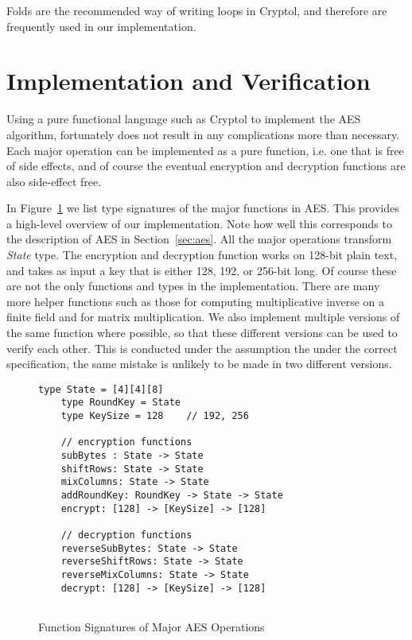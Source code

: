 \documentclass[a4paper, notitlepage]{report}
\begin{document}
Folds are the recommended way of writing loops in Cryptol, and therefore are
frequently used in our implementation.


\section{Implementation and Verification}
\label{sec:correct}

Using a pure functional language such as Cryptol to implement the AES algorithm,
fortunately does not result in any complications more than necessary. Each major
operation can be implemented as a pure function, i.e. one that is free of side
effects, and of course the eventual encryption and decryption functions are also
side-effect free.

In Figure~\ref{fig:functions} we list type signatures of the major functions
in AES. This provides a high-level overview of our implementation. Note how
well this corresponds to the description of AES in Section~\ref{sec:aes}.
All the major operations transform \emph{State} type. The encryption and decryption
function works on 128-bit plain text, and takes as input a key that is either
128, 192, or 256-bit long. Of course these are not the only functions and types in
the implementation. There are many more helper functions such as those for computing
multiplicative inverse on a finite field and for matrix multiplication.
We also implement multiple versions of the same function where possible, so that
these different versions can be used to verify each other. This is conducted
under the assumption the under the correct specification, the same mistake is
unlikely to be made in two different versions.

\begin{figure}
  \begin{lstlisting}[frame=single]
    type State = [4][4][8]
    type RoundKey = State
    type KeySize = 128    // 192, 256

    // encryption functions
    subBytes : State -> State
    shiftRows: State -> State
    mixColumns: State -> State
    addRoundKey: RoundKey -> State -> State
    encrypt: [128] -> [KeySize] -> [128]

    // decryption functions
    reverseSubBytes: State -> State
    reverseShiftRows: State -> State
    reverseMixColumns: State -> State
    decrypt: [128] -> [KeySize] -> [128]
    
  \end{lstlisting}
  \caption{Function Signatures of Major AES Operations}
  \label{fig:functions}
\end{figure}
\end{document}

